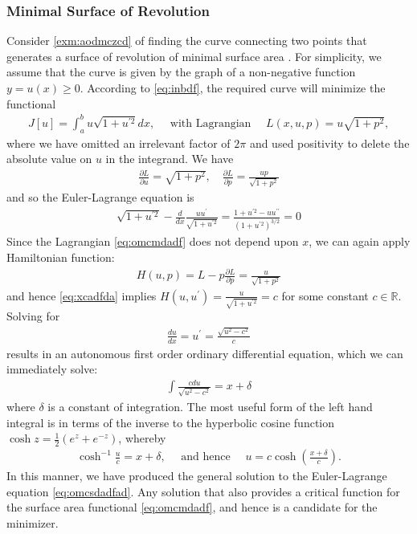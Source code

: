 \documentclass{article}
\begin{document}
\subsubsection{Minimal Surface of Revolution}
Consider \cref{exm:aodmczcd} of finding the curve connecting two points that generates a surface of revolution of minimal surface area . For simplicity, we assume that the curve is given by the graph of a non-negative function $y=u(x) \geq 0$. According to \cref{eq:inbdf}, the required curve will minimize the functional 
\begin{align}
    J[u]=\int_{a}^{b} u \sqrt{1+u^{\prime 2}} d x, \quad\text{ with Lagrangian }\quad L(x, u, p)=u \sqrt{1+p^{2}},\label{eq:omcmdadf}
\end{align}
where we have omitted an irrelevant factor of $2 \pi$ and used positivity to delete the absolute value on $u$ in the integrand.
We have
\begin{align*}
\frac{\partial L}{\partial u}=\sqrt{1+p^{2}}, \quad \frac{\partial L}{\partial p}=\frac{u p}{\sqrt{1+p^{2}}}
\end{align*}
and so the Euler-Lagrange equation is
\begin{align}
\sqrt{1+u^{\prime 2}}-\frac{d}{d x} \frac{u u^{\prime}}{\sqrt{1+u^{\prime 2}}}=\frac{1+u^{\prime 2}-u u^{\prime \prime}}{\left(1+u^{\prime 2}\right)^{3 / 2}}=0\label{eq:omcsdadfad}
\end{align}
Since the Lagrangian \cref{eq:omcmdadf} does not depend upon $x$, we can again apply Hamiltonian function:
\begin{align*}
H(u, p)=L-p \frac{\partial L}{\partial p}=\frac{u}{\sqrt{1+p^{2}}}
\end{align*}
and hence \cref{eq:xcadfda} implies $H\left(u, u^{\prime}\right)=\frac{u}{\sqrt{1+u^{\prime 2}}}=c$ for some constant $c \in \mathbb{R}$. Solving for
\begin{align*}
\frac{d u}{d x}=u^{\prime}=\frac{\sqrt{u^{2}-c^{2}}}{c}
\end{align*}
results in an autonomous first order ordinary differential equation, which we can immediately solve:
\begin{align*}
\int \frac{c d u}{\sqrt{u^{2}-c^{2}}}=x+\delta
\end{align*}
where $\delta$ is a constant of integration. The most useful form of the left hand integral is in terms of the inverse to the hyperbolic cosine function $\cosh z=\frac{1}{2}\left(e^{z}+e^{-z}\right)$, whereby
\begin{align}
     \cosh ^{-1} \frac{u}{c}=x+\delta, \quad\text{ and hence }\quad u=c \cosh \left(\frac{x+\delta}{c}\right).\label{eq:cczxc}
\end{align}
In this manner, we have produced the general solution to the Euler-Lagrange equation \cref{eq:omcsdadfad}. Any solution that also  provides a critical function for the surface area functional \cref{eq:omcmdadf}, and hence is a candidate for the minimizer.
\end{document}
